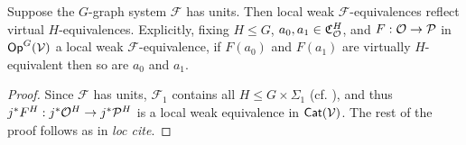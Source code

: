 \documentclass[a4paper,10pt
,draft
]{article}%
\renewcommand{\F}{\mathcal F}
\renewcommand{\1}{\eta}%
\begin{document}
\begin{lemma}
      \label{REF_VIRT_LEM}
      Suppose the $G$-graph system $\F$ has units.
      Then local weak $\F$-equivalences reflect virtual $H$-equivalences.
      Explicitly,
      fixing $H \leq G$, 
      $a_0,a_1 \in \mathfrak C_{\mathcal{O}}^H$, and $F: \mathcal{O} \to \mathcal{P}$ in $\mathsf{Op}^G(\mathcal V)$ a local weak $\F$-equivalence,
      if $F(a_0)$ and $F(a_1)$ are virtually $H$-equivalent then so are $a_0$ and $a_1$.
\end{lemma}
\begin{proof}
      Since $\F$ has units, $\F_1$ contains all $H \leq G \times \Sigma_1$ (cf. \cite[Remark 4.50]{BP_geo}), and thus
      $j^{\**}F^H: j^{\**}\O^H \to j^{\**}\P^H$ is a local weak equivalence in $\mathsf{Cat}(\mathcal V)$.
      The rest of the proof follows as in \textit{loc cite}.

\end{proof}
\end{document}
